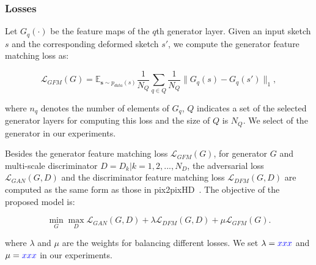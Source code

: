 
\subsubsection{Losses}



Let $G_q(·)$ be the  feature maps of the $q$th generator layer.
Given an input sketch $s$ and the corresponding deformed sketch $s'$, we compute the generator feature matching loss as:

\begin{equation}
	\label{eqn:loss_GFM}
	\mathcal{L}_{GFM}(G)=\mathbb{E}_{\mathbf{s}\sim p_{data}(s)} \frac{1}{N_Q} \sum_{q\in Q}  \frac{1}{N_Q} \|G_q(s)-G_q(s') \|_1,
\end{equation}

where $n_q$ denotes the number of elements of $G_q$, $Q$ indicates a set of the selected generator layers for computing this loss and the size of $Q$ is $N_Q$. 
We select  of the generator in our experiments.

Besides the generator feature matching loss $\mathcal{L}_{GFM}(G)$, for generator $G$ and multi-scale discriminator $D={D_k | k=1,2,...,N_D}$, the adversarial loss $\mathcal{L}_{GAN}(G, D)$ and the discriminator feature matching loss $\mathcal{L}_{DFM}(G, D)$ are computed as the same form as those in pix2pixHD~\cite{pix2pixHD}. 
%
The objective of the proposed model is:

\begin{equation}
	\label{eqn:new_minmax_game}
	\min_G \max_{D} \mathcal{L}_{GAN}(G, D)+\lambda \mathcal{L}_{DFM}(G, D) +\mu \mathcal{L}_{GFM}(G).
\end{equation}

where $\lambda$ and $\mu$ are the weights for balancing different losses. We set $\lambda=\textcolor{blue}{xxx}$ and $\mu=\textcolor{blue}{xxx}$ in our experiments.